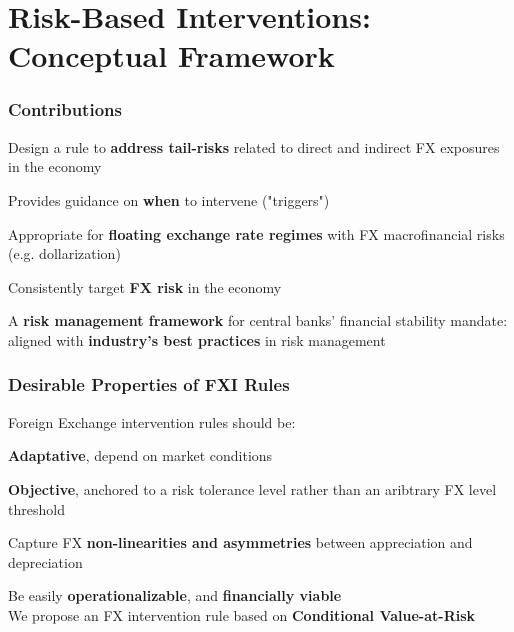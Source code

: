 \documentclass{beamer}
\newenvironment{largeitemize}{\itemize\addtolength{\itemsep}{10pt}}{\enditemize}
\begin{document}
\section{Risk-Based Interventions: Conceptual Framework}

\begin{frame}
  \frametitle{Contributions}
  \begin{largeitemize}
    \item Design a  rule to \textbf{address tail-risks} related  to direct and indirect
FX exposures in the economy
    \item Provides guidance on \textbf{when} to intervene ("triggers")
    \item Appropriate for \textbf{floating exchange rate regimes} with FX
      macrofinancial risks (e.g. dollarization)
    \item Consistently target \textbf{FX risk} in the economy
    \item A \textbf{risk management framework} for central banks' financial
      stability mandate: aligned with \textbf{industry's best practices} in risk management
  \end{largeitemize}  
\end{frame}

\begin{frame}
  \frametitle{Desirable Properties of FXI Rules}
  Foreign Exchange intervention rules should be:\\
  \medskip  
  \begin{largeitemize}
  \item \textbf{Adaptative}, depend on market conditions
  \item \textbf{Objective}, anchored to a risk tolerance level
    rather than an aribtrary FX level threshold
  \item Capture FX \textbf{non-linearities and asymmetries} between appreciation and
    depreciation
  \item Be easily \textbf{operationalizable}, and \textbf{financially viable}\\
  \end{largeitemize}
\medskip  
We propose an FX intervention rule based on \textbf{Conditional Value-at-Risk}  
\end{frame}
\end{document}
